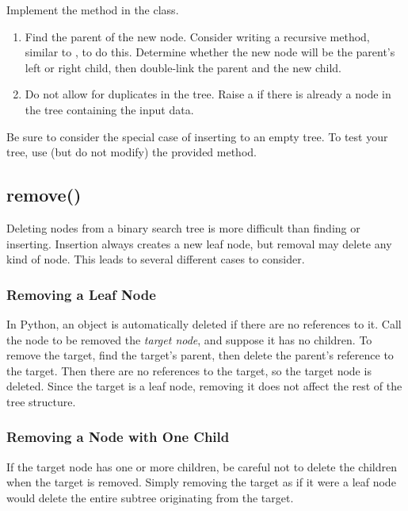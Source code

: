 \begin{problem} %
Implement the  method in the  class.
%
\begin{enumerate}
\item Find the parent of the new node.
Consider writing a recursive method, similar to , to do this.
Determine whether the new node will be the parent's left or right child, then double-link the parent and the new child.
\item Do not allow for duplicates in the tree. Raise a  if there is already a node in the tree containing the input data.
\end{enumerate}

Be sure to consider the special case of inserting to an empty tree.
To test your tree, use (but do not modify) the provided  method.
\end{problem}

\subsection*{remove()} %

Deleting nodes from a binary search tree is more difficult than finding or inserting.
Insertion always creates a new leaf node, but removal may delete any kind of node.
This leads to several different cases to consider.

\subsubsection*{Removing a Leaf Node} %

In Python, an object is automatically deleted if there are no references to it.
Call the node to be removed the \emph{target node}, and suppose it has no children.
To remove the target, find the target's parent, then delete the parent's reference to the target.
Then there are no references to the target, so the target node is deleted.
Since the target is a leaf node, removing it does not affect the rest of the tree structure.

\subsubsection*{Removing a Node with One Child} %

If the target node has one or more children, be careful not to delete the children when the target is removed.
Simply removing the target as if it were a leaf node would delete the entire subtree originating from the target.

